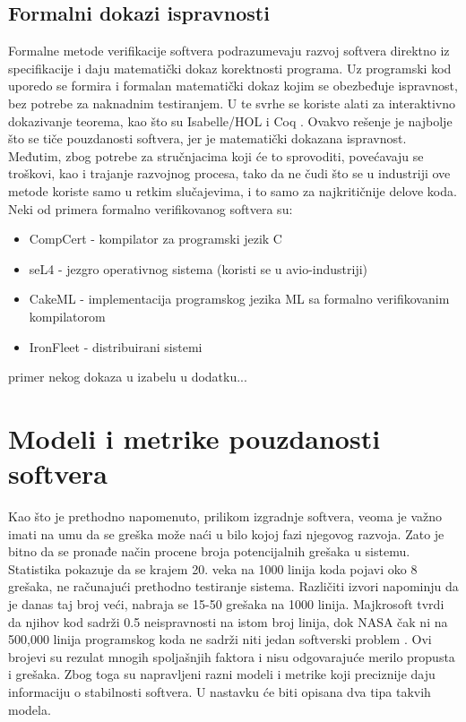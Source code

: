 \documentclass[a4paper]{article}
\begin{document}
\subsection{Formalni dokazi ispravnosti}
\label{subsec:formalni_dokazi}
Formalne metode verifikacije softvera podrazumevaju razvoj softvera direktno iz specifikacije i daju matematički dokaz korektnosti programa.
Uz programski kod uporedo se formira i formalan matematički dokaz kojim se obezbeđuje ispravnost, bez potrebe za naknadnim testiranjem.
U te svrhe se koriste alati za interaktivno dokazivanje teorema, kao što su Isabelle/HOL \cite{isabelle} i Coq \cite{coq}.
Ovakvo rešenje je najbolje što se tiče pouzdanosti softvera, jer je matematički dokazana ispravnost.
Međutim, zbog potrebe za stručnjacima koji će to sprovoditi, povećavaju se troškovi, kao i trajanje razvojnog procesa, tako da ne čudi što se u industriji ove metode koriste samo u retkim slučajevima, i to samo za najkritičnije delove koda.\\
Neki od primera formalno verifikovanog softvera su:
\begin{itemize}
\item CompCert - kompilator za programski jezik C \cite{compcert}
\item seL4 - jezgro operativnog sistema (koristi se u avio-industriji) \cite{sel4}
\item CakeML - implementacija programskog jezika ML sa formalno verifikovanim kompilatorom \cite{cakeml}
\item IronFleet - distribuirani sistemi \cite{ironfleet}
\end{itemize}

primer nekog dokaza u izabelu u dodatku...\\



\section{Modeli i metrike pouzdanosti softvera}	
\label{sec:modeli_metrike}

Kao što je prethodno napomenuto, prilikom izgradnje softvera, veoma je važno imati na umu da se greška može naći u bilo kojoj fazi njegovog razvoja. Zato je bitno da se pronađe način procene broja potencijalnih grešaka u sistemu.\\
Statistika pokazuje da se krajem 20. veka na 1000 linija koda pojavi oko 8 grešaka, ne računajući prethodno testiranje sistema. Različiti izvori napominju da je danas taj broj veći, nabraja se 15-50 grešaka na 1000 linija. Majkrosoft tvrdi da njihov kod sadrži 0.5 neispravnosti na istom broj linija, dok NASA čak ni na 500,000 linija programskog koda ne sadrži niti jedan softverski problem \cite{Statistika_prosek_gresaka}. Ovi brojevi su rezulat mnogih spoljašnjih faktora i nisu odgovarajuće merilo propusta i grešaka. Zbog toga su napravljeni razni modeli i metrike koji preciznije daju informaciju o stabilnosti softvera. U nastavku će biti opisana dva tipa takvih modela.\\
\end{document}
